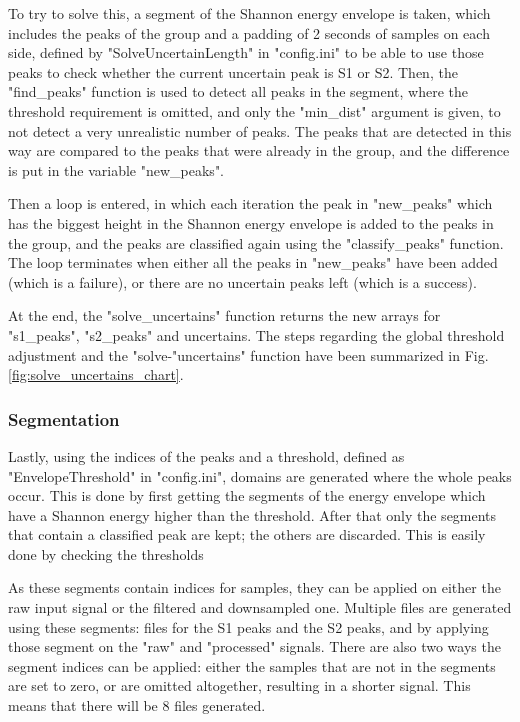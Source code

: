 To try to solve this, a segment of the Shannon energy envelope is taken, which includes the peaks of the group and a padding of 2 seconds of samples on each side, defined by "SolveUncertainLength" in "config.ini" to be able to use those peaks to check whether the current uncertain peak is S1 or S2. Then, the "find\_peaks" function is used to detect all peaks in the segment, where the threshold requirement is omitted, and only the "min\_dist" argument is given, to not detect a very unrealistic number of peaks. The peaks that are detected in this way are compared to the peaks that were already in the group, and the difference is put in the variable "new\_peaks".

Then a loop is entered, in which each iteration the peak in "new\_peaks" which has the biggest height in the Shannon energy envelope is added to the peaks in the group, and the peaks are classified again using the "classify\_peaks" function. The loop terminates when either all the peaks in "new\_peaks" have been added (which is a failure), or there are no uncertain peaks left (which is a success). 

At the end, the "solve\_uncertains" function returns the new arrays for "s1\_peaks", "s2\_peaks" and uncertains. The steps regarding the global threshold adjustment and the "solve-"uncertains" function have been summarized in Fig. \ref{fig:solve_uncertains_chart}.


\subsubsection{Segmentation}
Lastly, using the indices of the peaks and a threshold, defined as "EnvelopeThreshold" in "config.ini", domains are generated where the whole peaks occur. This is done by first getting the segments of the energy envelope which have a Shannon energy higher than the threshold. After that only the segments that contain a classified peak are kept; the others are discarded. This is easily done by checking the thresholds

As these segments contain indices for samples, they can be applied on either the raw input signal or the filtered and downsampled one. Multiple files are generated using these segments: files for the S1 peaks and the S2 peaks, and by applying those segment on the "raw" and "processed" signals. There are also two ways the segment indices can be applied: either the samples that are not in the segments are set to zero, or are omitted altogether, resulting in a shorter signal. This means that there will be 8 files generated.

